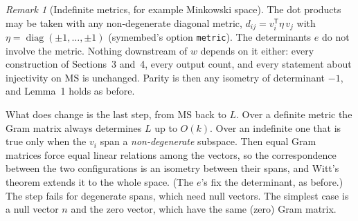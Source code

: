\documentclass[11pt]{article}
\theoremstyle{definition}
\theoremstyle{remark}
\newtheorem{remark}{Remark}
\newcommand{\MS}{\mathrm{MS}}
\begin{document}
\begin{remark}[Indefinite metrics, for example Minkowski space]\label{rem:metric}
The dot products may be taken with any non-degenerate diagonal metric,
$d_{ij} = v_i^{\mathsf T} \eta\, v_j$ with $\eta = \operatorname{diag}(\pm 1,
\ldots, \pm 1)$ (symembed's option \texttt{metric}). The determinants $e$ do not
involve the metric. Nothing downstream of $w$ depends on it either: every
construction of Sections~3 and~4, every output count, and every statement
about injectivity on $\MS$ is unchanged. Parity is then any isometry of
determinant $-1$, and Lemma~1 holds as before.

What does change is the last step, from $\MS$ back to $L$. Over a definite
metric the Gram matrix always determines $L$ up to $O(k)$. Over an indefinite
one that is true only when the $v_i$ span a \emph{non-degenerate} subspace.
Then equal Gram matrices force equal linear relations among the vectors, so the
correspondence between the two configurations is an isometry between their
spans, and Witt's theorem extends it to the whole space. (The $e$'s fix the
determinant, as before.) The step fails for degenerate spans, which need null
vectors. The simplest case is a null vector $n$ and the zero vector, which have
the same (zero) Gram matrix.


\end{remark}
\end{document}
